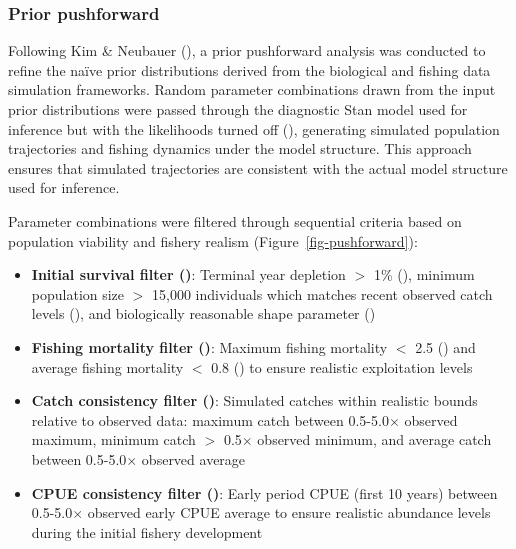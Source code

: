 \documentclass[
  11pt,
]{SCreport}
\providecommand{\tightlist}{%
  \setlength{\itemsep}{0pt}\setlength{\parskip}{0pt}}\usepackage{longtable,booktabs,array}
\begin{document}
\subsubsection{Prior pushforward}\label{sec-prior-pushforward}

Following Kim \& Neubauer (), a
prior pushforward analysis was conducted to refine the naïve prior
distributions derived from the biological and fishing data simulation
frameworks. Random parameter combinations drawn from the input prior
distributions were passed through the diagnostic Stan model used for
inference but with the likelihoods turned off
(), generating simulated population
trajectories and fishing dynamics under the model structure. This
approach ensures that simulated trajectories are consistent with the
actual model structure used for inference.

Parameter combinations were filtered through sequential criteria based
on population viability and fishery realism
(Figure~\ref{fig-pushforward}):

\begin{itemize}
\tightlist
\item
  \textbf{Initial survival filter ()}: Terminal
  year depletion \(>\) 1\% (), minimum
  population size \(>\) 15,000 individuals which matches recent observed
  catch levels (), and biologically reasonable
  shape parameter ()
\item
  \textbf{Fishing mortality filter ()}: Maximum
  fishing mortality \(<\) 2.5 () and average
  fishing mortality \(<\) 0.8 () to ensure
  realistic exploitation levels
\item
  \textbf{Catch consistency filter ()}: Simulated
  catches within realistic bounds relative to observed data: maximum
  catch between 0.5-5.0\(\times\) observed maximum, minimum catch \(>\)
  0.5\(\times\) observed minimum, and average catch between
  0.5-5.0\(\times\) observed average
\item
  \textbf{CPUE consistency filter ()}: Early
  period CPUE (first 10 years) between 0.5-5.0\(\times\) observed early
  CPUE average to ensure realistic abundance levels during the initial
  fishery development
\end{itemize}
\end{document}
